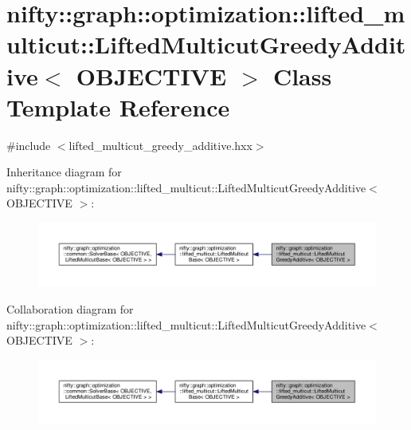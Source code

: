 \hypertarget{classnifty_1_1graph_1_1optimization_1_1lifted__multicut_1_1LiftedMulticutGreedyAdditive}{}\section{nifty\+:\+:graph\+:\+:optimization\+:\+:lifted\+\_\+multicut\+:\+:Lifted\+Multicut\+Greedy\+Additive$<$ O\+B\+J\+E\+C\+T\+I\+V\+E $>$ Class Template Reference}
\label{classnifty_1_1graph_1_1optimization_1_1lifted__multicut_1_1LiftedMulticutGreedyAdditive}


{\ttfamily \#include $<$lifted\+\_\+multicut\+\_\+greedy\+\_\+additive.\+hxx$>$}



Inheritance diagram for nifty\+:\+:graph\+:\+:optimization\+:\+:lifted\+\_\+multicut\+:\+:Lifted\+Multicut\+Greedy\+Additive$<$ O\+B\+J\+E\+C\+T\+I\+V\+E $>$\+:\nopagebreak
\begin{figure}[H]
\begin{center}
\leavevmode
\includegraphics[width=350pt]{classnifty_1_1graph_1_1optimization_1_1lifted__multicut_1_1LiftedMulticutGreedyAdditive__inherit__graph}
\end{center}
\end{figure}


Collaboration diagram for nifty\+:\+:graph\+:\+:optimization\+:\+:lifted\+\_\+multicut\+:\+:Lifted\+Multicut\+Greedy\+Additive$<$ O\+B\+J\+E\+C\+T\+I\+V\+E $>$\+:\nopagebreak
\begin{figure}[H]
\begin{center}
\leavevmode
\includegraphics[width=350pt]{classnifty_1_1graph_1_1optimization_1_1lifted__multicut_1_1LiftedMulticutGreedyAdditive__coll__graph}
\end{center}
\end{figure}
